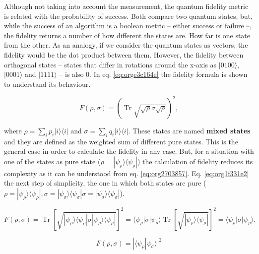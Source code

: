 Although not taking into account the measurement, the quantum fidelity metric is related with the probability of success.
Both compare two quantum states, but, while the success of an algorithm is a boolean metric -- either success or failure --, the fidelity returns a number of how different the states are.
How far is one state from the other.
As an analogy, if we consider the quantum states as vectors, the fidelity would be the dot product between them.
However, the fidelity between orthogonal states -- states that differ in rotations around the x-axis as \(| 0100 \rangle\), \(| 0001 \rangle\) and \(| 1111 \rangle\) -- is also 0.
In eq. \ref{eq:orge3c164e} the fidelity formula is shown to understand its behaviour.

\begin{equation}
\label{eq:orge3c164e}
{\displaystyle F(\rho ,\sigma )=\left(\operatorname {Tr} {\sqrt {{\sqrt {\rho }}\sigma {\sqrt {\rho }}}}\right)^{2},}
\end{equation}

where \(\rho =\sum _{i}p_{i}|i\rangle \langle i|\) and \(\sigma =\sum _{i}q_{i}|i\rangle \langle i|\).
These states are named \textbf{mixed states} and they are defined as the weighted sum of different pure states.
This is the general case in order to calculate the fidelity in any case.
But, for a situation with one of the states as pure state (\({\displaystyle \rho =|\psi _{\rho }\rangle \!\langle \psi _{\rho }|}\)) the calculation of fidelity reduces its complexity as it can be understood from eq. \ref{eq:org2703857}.
Eq. \ref{eq:org1f331e2} the next step of simplicity, the one in which both states are pure (\({\displaystyle \rho =|\psi _{\rho }\rangle \!\langle \psi _{\rho }|}, {\displaystyle \sigma =|\psi _{\sigma }\rangle \!\langle \psi _{\sigma }|} {\displaystyle \sigma =|\psi _{\sigma }\rangle \!\langle \psi _{\sigma }|}\)).


\begin{equation}
\label{eq:org2703857}
{\displaystyle F(\rho ,\sigma )=\operatorname {Tr} \left[{\sqrt {|\psi _{\rho }\rangle \langle \psi _{\rho }|\sigma |\psi _{\rho }\rangle \langle \psi _{\rho }|}}\right]^{2}=\langle \psi _{\rho }|\sigma |\psi _{\rho }\rangle \operatorname {Tr} \left[{\sqrt {|\psi _{\rho }\rangle \langle \psi _{\rho }|}}\right]^{2}=\langle \psi _{\rho }|\sigma |\psi _{\rho }\rangle .}
\end{equation}

\begin{equation}
\label{eq:org1f331e2}
{\displaystyle F(\rho ,\sigma )=|\langle \psi _{\rho }|\psi _{\sigma }\rangle |^{2}}
\end{equation}


